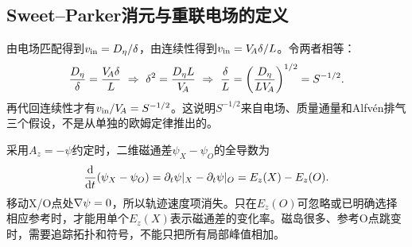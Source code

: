 \subsection{Sweet--Parker消元与重联电场的定义}
由电场匹配得到$v_{\rm in}=D_\eta/\delta$，由连续性得到$v_{\rm in}=V_{\!A}\delta/L$。令两者相等：
\begin{equation}
 {D_\eta\over\delta}={V_{\!A}\delta\over L}
 \ \Rightarrow\ \delta^2={D_\eta L\over V_{\!A}}
 \ \Rightarrow\ {\delta\over L}=\left({D_\eta\over LV_{\!A}}\right)^{1/2}
 =S^{-1/2}.
\end{equation}
再代回连续性才有$v_{\rm in}/V_{\!A}=S^{-1/2}$。这说明$S^{-1/2}$来自电场、质量通量和Alfvén排气三个假设，不是从单独的欧姆定律推出的。

采用$A_z=-\psi$约定时，二维磁通差$\psi_X-\psi_O$的全导数为
\begin{equation}
 {\mathrm d\over\mathrm dt}(\psi_X-\psi_O)
 =\partial_t\psi|_X-\partial_t\psi|_O=E_z(X)-E_z(O).
\end{equation}
移动X/O点处$\nabla\psi=0$，所以轨迹速度项消失。只在$E_z(O)$可忽略或已明确选择相应参考时，才能用单个$E_z(X)$表示磁通差的变化率。磁岛很多、参考O点跳变时，需要追踪拓扑和符号，不能只把所有局部峰值相加。

